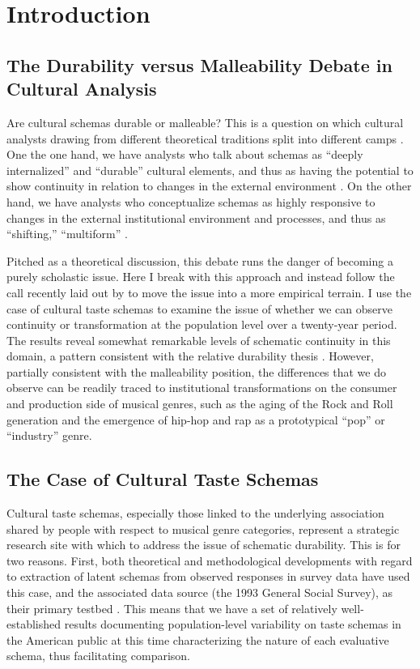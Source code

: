 \documentclass[preprint, authoryear,11pt, 3p]{elsarticle}
\begin{document}
\section{Introduction}
\subsection{The Durability versus Malleability Debate in Cultural Analysis}
Are cultural schemas durable or malleable? This is a question on which cultural analysts drawing from different theoretical traditions split into different camps \citep{vaisey2016cultural}. One the one hand, we have analysts who talk about schemas as ``deeply internalized'' and ``durable'' cultural elements, and thus as having the potential to show continuity in relation to changes in the external environment \citep{bourdieu1990logic, strauss1997cognitive, patterson2014making}. On the other hand, we have analysts who conceptualize schemas as highly responsive to changes in the external institutional environment and processes, and thus as ``shifting,'' ``multiform'' \citep{dimaggio1997culture, swidler2005anchors, sewell2004concept}. 

Pitched as a theoretical discussion, this debate runs the danger of becoming a purely scholastic issue. Here I break with this approach and instead follow the call recently laid out by \citet{vaisey2016cultural} to move the issue into a more empirical terrain. I use the case of cultural taste schemas to examine the issue of whether we can observe continuity or transformation at the population level over a twenty-year period. The results reveal somewhat remarkable levels of schematic continuity in this domain, a pattern consistent with the relative durability thesis \citep{vaisey2016cultural}. However, partially consistent with the malleability position, the differences that we do observe can be readily traced to institutional transformations on the consumer and production side of musical genres, such as the aging of the Rock and Roll generation and the emergence of hip-hop and rap as a prototypical ``pop'' or ``industry'' genre. 
\subsection{The Case of Cultural Taste Schemas}

Cultural taste schemas, especially those linked to the underlying association shared by people with respect to musical genre categories, represent a strategic research site with which to address the issue of schematic durability. This is for two reasons. First, both theoretical and methodological developments with regard to extraction of latent schemas from observed responses in survey data have used this case, and the associated data source (the 1993 General Social Survey), as their primary testbed \citep{goldberg2011mapping, boutyline2017improving}. This means that we have a set of relatively well-established results documenting population-level variability on taste schemas in the American public at this time characterizing the nature of each evaluative schema, thus facilitating comparison. 
\end{document}
